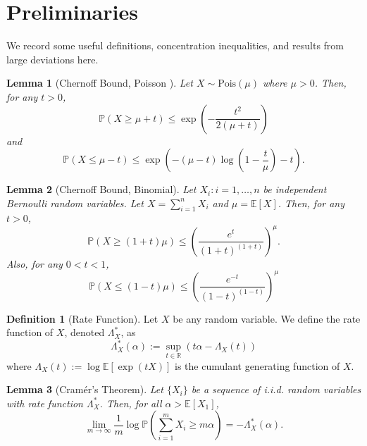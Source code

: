 \documentclass{article}
\newcommand{\R}{\mathbb{R}}
\renewcommand{\P}{\mathbb{P}}
\newcommand{\E}{\mathbb{E}}
\newcommand{\1}{\mathbbm{1}}
\theoremstyle{definition}
\newtheorem{definition}{Definition}
\theoremstyle{plain}
\newtheorem{lemma}{Lemma}
\begin{document}
\appendix
\section{Preliminaries}
We record some useful definitions, concentration inequalities, and results from large deviations here.

\begin{lemma}[Chernoff Bound, Poisson \cite{Lugosi+2013}]
\label{lem:poisson_Chernoff}
    Let $X \sim \text{Pois}(\mu)$ where $\mu > 0$. Then, for any $t > 0$,
    \begin{equation*}
        \P(X \geq \mu + t) \leq \exp\left(-\frac{t^2}{2(\mu + t)}\right)
    \end{equation*}
    and
    \begin{equation*}
        \P(X \leq \mu - t) \leq \exp \left(- (\mu - t) \log \left(1 - \frac{t}{\mu}\right) -t \right).
    \end{equation*}
\end{lemma}

\begin{lemma}[Chernoff Bound, Binomial]
\label{lem:binomial_Chernoff}
    Let $X_i: i=1, \ldots, n$ be independent Bernoulli random variables. Let $X = \sum_{i=1}^n X_i$ and $\mu = \E[X]$. Then, for any $t > 0$,
    \begin{equation*}
        \P(X \geq (1 + t)\mu) \leq \left(\frac{e^t}{(1+t)^{(1+t)}}\right)^\mu.
    \end{equation*}
    Also, for any $0 < t < 1$,
    \begin{equation*}
        \P(X \leq (1 - t)\mu) \leq \left(\frac{e^{-t}}{(1-t)^{(1-t)}}\right)^\mu
    \end{equation*}
\end{lemma}

\begin{definition}[Rate Function]
    Let $X$ be any random variable. We define the rate function of $X$, denoted $\Lambda_X^*$, as
    \begin{equation*}
        \Lambda_X^*(\alpha) := \sup_{t \in \R} (t\alpha - \Lambda_X(t))
    \end{equation*}
    where $\Lambda_X(t) := \log \E[\exp(tX)]$ is the cumulant generating function of $X$.
\end{definition}

\begin{lemma}[Cram\'er's Theorem]
\label{lem:Cramer}
Let $\{X_i\}$ be a sequence of i.i.d. random variables with rate function $\Lambda_X^*$. Then, for all $\alpha > \E[X_1]$,
    \begin{equation*}
        \lim_{m \to \infty} \frac{1}{m} \log \P(\sum_{i=1}^m X_i \geq m\alpha) = -\Lambda^*_X(\alpha).
    \end{equation*}
\end{lemma}
\end{document}
